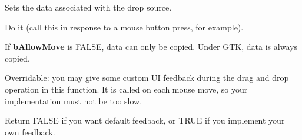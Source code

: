 
\label{wxdropsourcesetdata}


Sets the data  associated with the drop source.

\label{wxdropsourcedodragdrop}


Do it (call this in response to a mouse button press, for example).

If {\bf bAllowMove} is FALSE, data can only be copied. Under GTK, data
is always copied.

\label{wxdropsourcegivefeedback}


Overridable: you may give some custom UI feedback during the drag and drop operation
in this function. It is called on each mouse move, so your implementation must not be too
slow.





Return FALSE if you want default feedback, or TRUE if you implement your own
feedback.


